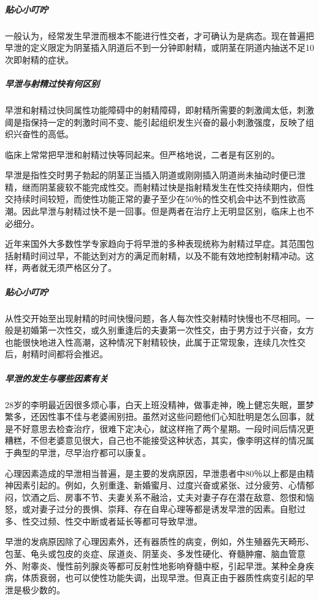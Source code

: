 \subparagraph{贴心小叮咛}

一般认为，经常发生早泄而根本不能进行性交者，才可确认为是病态。现在普遍把早泄的定义限定为阴茎插入阴道后不到一分钟即射精，或阴茎在阴道内抽送不足10次即射精的症状。

\subparagraph{早泄与射精过快有何区别}

早泄和射精过快同属性功能障碍中的射精障碍，即射精所需要的刺激阈太低，刺激阈是指保持一定的刺激时间不变、能引起组织发生兴奋的最小刺激强度，反映了组织兴奋性的高低。

临床上常常把早泄和射精过快等同起来。但严格地说，二者是有区别的。

早泄是指性交时男子勃起的阴茎正当插入阴道或刚刚插入阴道尚未抽动时便已泄精，继而阴茎疲软不能完成性交。而射精过快是指射精发生在性交持续期内，但性交持续时间较短，而使性功能正常的妻子至少在50％的性交机会中达不到性欲高潮。因此早泄与射精过快不是一回事。但是两者在治疗上无明显区别，临床上也不必细分。

近年来国外大多数性学专家趋向于将早泄的多种表现统称为射精过早症。其范围包括射精时间过早，不能达到对方的满足而射精，以及不能有效地控制射精冲动。这样，两者就无须严格区分了。

\subparagraph{贴心小叮咛}

从性交开始至出现射精的时间快慢问题，各人每次性交射精时快慢也不尽相同。一般是初婚第一次性交，或久别重逢后的夫妻第一次性交，由于男方过于兴奋，女方也能很快地进入性高潮，这种情况下射精较快，此属于正常现象，连续几次性交后，射精时间都将会推迟。

\subparagraph{早泄的发生与哪些因素有关}

28岁的李明最近因很多烦心事，白天上班没精神，做事走神，晚上健忘失眠，噩梦繁多，还因性事不佳与老婆闹别扭。虽然对这些问题他们心知肚明是怎么回事，就是不好意思去检查治疗，很难下定决心，就这样拖了两个星期。一段时间后情况更糟糕，不但老婆意见很大，自己也不能接受这种状态，其实，像李明这样的情况属于典型的早泄，尽早治疗都可以康复。

心理因素造成的早泄相当普遍，是主要的发病原因，早泄患者中80％以上都是由精神因素引起的。例如，久别重逢、新婚蜜月、过度兴奋或紧张、过分疲劳、心情郁闷，饮酒之后、房事不节、夫妻关系不融洽，丈夫对妻子存在潜在敌意、怨恨和恼怒，或对妻子过分的畏惧、崇拜、存在自卑心理等都是诱发早泄的因素。自慰过多、性交过频、性交中断或者延长等都可导致早泄。

早泄的发病原因除了心理因素外，还有器质性的病变，例如，外生殖器先天畸形、包茎、龟头或包皮的炎症、尿道炎、阴茎炎、多发性硬化、脊髓肿瘤、脑血管意外、附睾炎、慢性前列腺炎等都可反射性地影响脊髓中枢，引起早泄。某种全身疾病，体质衰弱，也可以使性功能失调，出现早泄。但真正由于器质性病变引起的早泄是极少数的。

